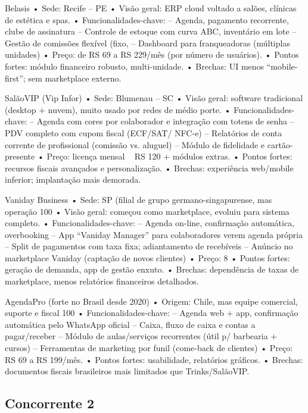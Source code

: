  Belasis
 • Sede: Recife – PE
 • Visão geral: ERP cloud voltado a salões, clínicas de estética e spas.
 • Funcionalidades-chave:
 – Agenda, pagamento recorrente, clube de assinatura
 – Controle de estoque com curva ABC, inventário em lote
 – Gestão de comissões flexível (fixo, %
 – Dashboard para franqueadoras (múltiplas unidades)
 • Preço: de RS 69 a RS 229/mês (por número de usuários).
 • Pontos fortes: módulo financeiro robusto, multi-unidade.
 • Brechas: UI menos “mobile-first”; sem marketplace externo.
 
 SalãoVIP (Vip Infor)
 • Sede: Blumenau – SC
 • Visão geral: software tradicional (desktop + nuvem), muito usado por redes de médio porte.
 • Funcionalidades-chave:
 – Agenda com cores por colaborador e integração com totens de senha
 – PDV completo com cupom fiscal (ECF/SAT/ NFC-e)
 – Relatórios de conta corrente de profissional (comissão vs. aluguel)
 – Módulo de fidelidade e cartão-presente
 • Preço: licença mensal ~ RS 120 + módulos extras.
 • Pontos fortes: recursos fiscais avançados e personalização.
 • Brechas: experiência web/mobile inferior; implantação mais demorada.
 
 Vaniday Business
 • Sede: SP (filial de grupo germano-singapurense, mas operação 100 %
 • Visão geral: começou como marketplace, evoluiu para sistema completo.
 • Funcionalidades-chave:
 – Agenda on-line, confirmação automática, overbooking
 – App “Vaniday Manager” para colaboradores verem agenda própria
 – Split de pagamentos com taxa fixa; adiantamento de recebíveis
 – Anúncio no marketplace Vaniday (captação de novos clientes)
 • Preço: 8 %
 • Pontos fortes: geração de demanda, app de gestão enxuto.
 • Brechas: dependência de taxas de marketplace, menos relatórios financeiros detalhados.
 
 AgendaPro (forte no Brasil desde 2020)
 • Origem: Chile, mas equipe comercial, suporte e fiscal 100 %
 • Funcionalidades-chave:
 – Agenda web + app, confirmação automática pelo WhatsApp oficial
 – Caixa, fluxo de caixa e contas a pagar/receber
 – Módulo de aulas/serviços recorrentes (útil p/ barbearia + cursos)
 – Ferramentas de marketing por funil (come-back de clientes)
 • Preço: RS 69 a RS 199/mês.
 • Pontos fortes: usabilidade, relatórios gráficos.
 • Brechas: documentos fiscais brasileiros mais limitados que Trinks/SalãoVIP.

\subsection{Concorrente 2}


